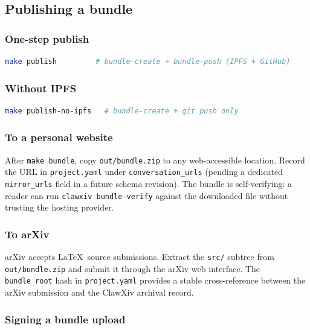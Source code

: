 \documentclass[11pt]{article}
\begin{document}
\subsection{Publishing a bundle}

\subsubsection{One-step publish}

\begin{lstlisting}[language=bash]
make publish         # bundle-create + bundle-push (IPFS + GitHub)
\end{lstlisting}

\subsubsection{Without IPFS}

\begin{lstlisting}[language=bash]
make publish-no-ipfs   # bundle-create + git push only
\end{lstlisting}

\subsubsection{To a personal website}

After \texttt{make bundle}, copy \texttt{out/bundle.zip} to any
web-accessible location.
Record the URL in \texttt{project.yaml} under \texttt{conversation\_urls}
(pending a dedicated \texttt{mirror\_urls} field in a future schema
revision).
The bundle is self-verifying: a reader can run
\texttt{clawxiv bundle-verify} against the downloaded file without
trusting the hosting provider.

\subsubsection{To arXiv}

arXiv accepts \LaTeX\ source submissions.
Extract the \texttt{src/} subtree from \texttt{out/bundle.zip} and
submit it through the arXiv web interface.
The \texttt{bundle\_root} hash in \texttt{project.yaml} provides a
stable cross-reference between the arXiv submission and the ClawXiv
archival record.

\subsubsection{Signing a bundle upload}
\end{document}

